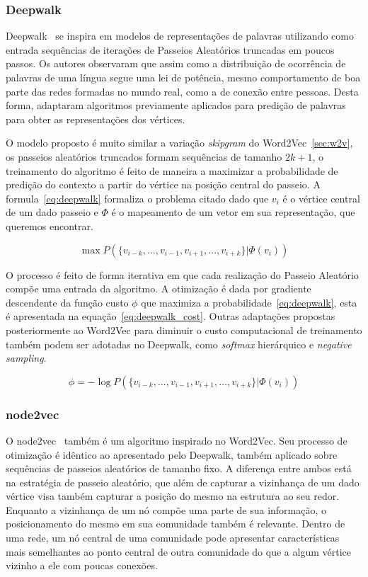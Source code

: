 \subsubsection{Deepwalk}

Deepwalk~\cite{perozzi14} se inspira em modelos de representações de palavras
utilizando como entrada sequências de iterações de Passeios Aleatórios truncadas
em poucos passos.
Os autores observaram que assim como a distribuição de ocorrência de palavras de
uma língua segue uma lei de potência, mesmo comportamento de boa parte das redes
formadas no mundo real, como a de conexão entre pessoas.
Desta forma, adaptaram algoritmos previamente aplicados para predição de
palavras para obter as representações dos vértices.

O modelo proposto é muito similar a variação \textit{skipgram} do
Word2Vec~\ref{sec:w2v}, os passeios aleatórios truncados formam sequências de
tamanho $2k + 1$, o treinamento do algoritmo é feito de maneira a maximizar a
probabilidade de predição do contexto a partir do vértice na posição central do
passeio.
A formula~\ref{eq:deepwalk} formaliza o problema citado dado que $v_i$ é o
vértice central de um dado passeio e $\Phi$ é o mapeamento de um vetor em sua
representação, que queremos encontrar.

\begin{equation} \label{eq:deepwalk}
    \operatorname{max} P(\{v_{i-k},...,v_{i-1},v_{i+1},...,v_{i+k}\}|\Phi(v_i))
\end{equation}

O processo é feito de forma iterativa em que cada realização do Passeio
Aleatório compõe uma entrada da algoritmo.
A otimização é dada por gradiente descendente da função custo $\phi$ que maximiza
a probabilidade~\ref{eq:deepwalk}, esta é apresentada na
equação~\ref{eq:deepwalk_cost}.
Outras adaptações propostas posteriormente ao Word2Vec para diminuir o custo
computacional de treinamento também podem ser adotadas no Deepwalk, como
\textit{softmax} hierárquico e \textit{negative sampling}.

\begin{equation} \label{eq:deepwalk_cost}
    \phi = -\log P(\{v_{i-k},...,v_{i-1},v_{i+1},...,v_{i+k}\}|\Phi(v_i))
\end{equation}

\subsubsection{node2vec}

O node2vec~\cite{grover16} também é um algoritmo inspirado no Word2Vec.
Seu processo de otimização é idêntico ao apresentado pelo Deepwalk, também
aplicado sobre sequências de passeios aleatórios de tamanho fixo.
A diferença entre ambos está na estratégia de passeio aleatório, que além de
capturar a vizinhança de um dado vértice visa também capturar a posição do mesmo
na estrutura ao seu redor.
Enquanto a vizinhança de um nó compõe uma parte de sua informação, o
posicionamento do mesmo em sua comunidade também é relevante.
Dentro de uma rede, um nó central de uma comunidade pode apresentar
características mais semelhantes ao ponto central de outra comunidade
do que a algum vértice vizinho a ele com poucas conexões.

